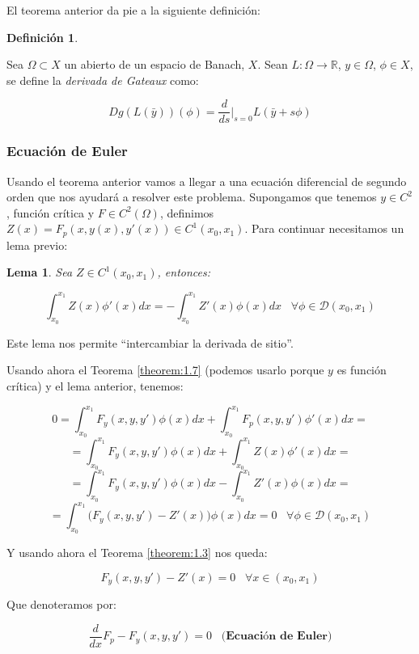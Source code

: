 \documentclass[12pt]{article}
\newcommand{\R}{\mathbb{R}}
\newtheorem{lemma}[theorem]{Lema}
\theoremstyle{definition}
\newtheorem{definition}[theorem]{Definición}
\theoremstyle{remark}
\newcommand{\soportecompacto}{\mathcal{D}(x_0,x_1)}
\newcommand{\integral}[3]{\displaystyle\int_{ #1 }^{ #2 } #3 }
\newcommand{\xcero}{(x_0,x_1)}
\newcommand{\espacio}{\;\;\;}
\begin{document}
El teorema anterior da pie a la siguiente definición:

\begin{definition}
\label{gateaux}

Sea $\Omega\subset X$ un abierto de un espacio de Banach, $X$. Sean $L:\Omega\longrightarrow\R$, $y\in \Omega$, $\phi\in X$, se define la \textit{derivada de Gateaux} como:

\[
Dg(L(\bar{y}))(\phi)=\frac{d}{ds}\Big|_{s=0}L(\bar{y}+s\phi)
\]

\end{definition}

\subsubsection{Ecuación de Euler}

Usando el teorema anterior vamos a llegar a una ecuación diferencial de segundo orden que nos ayudará a resolver este problema. Supongamos que tenemos $y\in C^2$, función crítica y $F\in C^2(\Omega)$, definimos $Z(x)=F_p(x,y(x),y'(x))\in C^1(x_0,x_1)$. Para continuar necesitamos un lema previo:

\begin{lemma}
Sea $Z\in C^1(x_0,x_1)$, entonces:

\[
\integral{x_0}{x_1}{Z(x)\phi'(x)dx}=-\integral{x_0}{x_1}{Z'(x)\phi(x)dx} \espacio \forall \phi\in\soportecompacto
\]
\end{lemma}

Este lema nos permite \enquote{intercambiar la derivada de sitio}.

Usando ahora el Teorema \ref{theorem:1.7} (podemos usarlo porque $y$ es función crítica) y el lema anterior, tenemos:

\[
0=\integral{x_0}{x_1}{F_y(x,y, y')}\phi(x)dx+\integral{x_0}{x_1}{F_p(x,y,y')}\phi'(x)dx= 
\]
\[
=\integral{x_0}{x_1}{F_y(x,y, y')}\phi(x)dx+\integral{x_0}{x_1}{Z(x)}\phi'(x)dx=
\]
\[
=\integral{x_0}{x_1}{F_y(x,y, y')}\phi(x)dx-\integral{x_0}{x_1}{Z'(x)}\phi(x)dx=
\]
\[
=\integral{x_0}{x_1}{\Big(F_y(x,y, y')-Z'(x)\Big)}\phi(x)dx=0 \espacio \forall\phi\in\soportecompacto
\]

Y usando ahora el Teorema \ref{theorem:1.3} nos queda:

\[
F_y(x,y,y')-Z'(x)=0 \espacio \forall x \in\xcero
\]

Que denoteramos por:

\[
\frac{d}{dx}F_p-F_y(x,y,y')=0 \espacio \textbf{(Ecuación de Euler)}
\]
\end{document}
